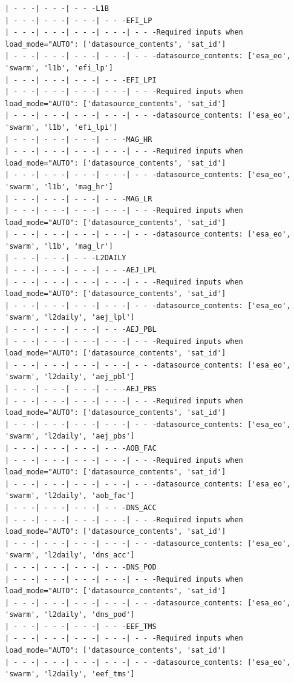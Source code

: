\begin{verbatim}
| - - -| - - -| - - -L1B
| - - -| - - -| - - -| - - -EFI_LP
| - - -| - - -| - - -| - - -| - - -Required inputs when load_mode="AUTO": ['datasource_contents', 'sat_id']
| - - -| - - -| - - -| - - -| - - -datasource_contents: ['esa_eo', 'swarm', 'l1b', 'efi_lp']
| - - -| - - -| - - -| - - -EFI_LPI
| - - -| - - -| - - -| - - -| - - -Required inputs when load_mode="AUTO": ['datasource_contents', 'sat_id']
| - - -| - - -| - - -| - - -| - - -datasource_contents: ['esa_eo', 'swarm', 'l1b', 'efi_lpi']
| - - -| - - -| - - -| - - -MAG_HR
| - - -| - - -| - - -| - - -| - - -Required inputs when load_mode="AUTO": ['datasource_contents', 'sat_id']
| - - -| - - -| - - -| - - -| - - -datasource_contents: ['esa_eo', 'swarm', 'l1b', 'mag_hr']
| - - -| - - -| - - -| - - -MAG_LR
| - - -| - - -| - - -| - - -| - - -Required inputs when load_mode="AUTO": ['datasource_contents', 'sat_id']
| - - -| - - -| - - -| - - -| - - -datasource_contents: ['esa_eo', 'swarm', 'l1b', 'mag_lr']
| - - -| - - -| - - -L2DAILY
| - - -| - - -| - - -| - - -AEJ_LPL
| - - -| - - -| - - -| - - -| - - -Required inputs when load_mode="AUTO": ['datasource_contents', 'sat_id']
| - - -| - - -| - - -| - - -| - - -datasource_contents: ['esa_eo', 'swarm', 'l2daily', 'aej_lpl']
| - - -| - - -| - - -| - - -AEJ_PBL
| - - -| - - -| - - -| - - -| - - -Required inputs when load_mode="AUTO": ['datasource_contents', 'sat_id']
| - - -| - - -| - - -| - - -| - - -datasource_contents: ['esa_eo', 'swarm', 'l2daily', 'aej_pbl']
| - - -| - - -| - - -| - - -AEJ_PBS
| - - -| - - -| - - -| - - -| - - -Required inputs when load_mode="AUTO": ['datasource_contents', 'sat_id']
| - - -| - - -| - - -| - - -| - - -datasource_contents: ['esa_eo', 'swarm', 'l2daily', 'aej_pbs']
| - - -| - - -| - - -| - - -AOB_FAC
| - - -| - - -| - - -| - - -| - - -Required inputs when load_mode="AUTO": ['datasource_contents', 'sat_id']
| - - -| - - -| - - -| - - -| - - -datasource_contents: ['esa_eo', 'swarm', 'l2daily', 'aob_fac']
| - - -| - - -| - - -| - - -DNS_ACC
| - - -| - - -| - - -| - - -| - - -Required inputs when load_mode="AUTO": ['datasource_contents', 'sat_id']
| - - -| - - -| - - -| - - -| - - -datasource_contents: ['esa_eo', 'swarm', 'l2daily', 'dns_acc']
| - - -| - - -| - - -| - - -DNS_POD
| - - -| - - -| - - -| - - -| - - -Required inputs when load_mode="AUTO": ['datasource_contents', 'sat_id']
| - - -| - - -| - - -| - - -| - - -datasource_contents: ['esa_eo', 'swarm', 'l2daily', 'dns_pod']
| - - -| - - -| - - -| - - -EEF_TMS
| - - -| - - -| - - -| - - -| - - -Required inputs when load_mode="AUTO": ['datasource_contents', 'sat_id']
| - - -| - - -| - - -| - - -| - - -datasource_contents: ['esa_eo', 'swarm', 'l2daily', 'eef_tms']

\end{verbatim}
